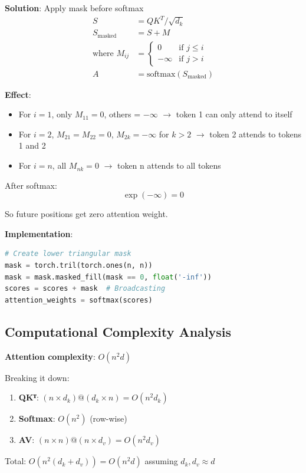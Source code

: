 \documentclass[11pt,oneside]{book}
\begin{document}
\textbf{Solution}: Apply mask before softmax
\begin{align*}
S &= QK^T / \sqrt{d_k} \\
S_{\text{masked}} &= S + M \\
\text{where } M_{ij} &= \begin{cases} 0 & \text{if } j \leq i \\ -\infty & \text{if } j > i \end{cases} \\
A &= \text{softmax}(S_{\text{masked}})
\end{align*}

\textbf{Effect}:
\begin{itemize}
\item For $i=1$, only $M_{11} = 0$, others = $-\infty$ $\to$ token 1 can only attend to itself
\item For $i=2$, $M_{21} = M_{22} = 0$, $M_{2k} = -\infty$ for $k>2$ $\to$ token 2 attends to tokens 1 and 2
\item For $i=n$, all $M_{nk} = 0$ $\to$ token n attends to all tokens
\end{itemize}

After softmax:
\[
\exp(-\infty) = 0
\]

So future positions get zero attention weight.

\textbf{Implementation}:
\begin{lstlisting}[language=Python]
# Create lower triangular mask
mask = torch.tril(torch.ones(n, n))
mask = mask.masked_fill(mask == 0, float('-inf'))
scores = scores + mask  # Broadcasting
attention_weights = softmax(scores)
\end{lstlisting}

\subsection{Computational Complexity Analysis}

\textbf{Attention complexity}: $O(n^2 d)$

Breaking it down:
\begin{enumerate}
\item \textbf{QKᵀ}: $(n \times d_k) @ (d_k \times n) = O(n^2 d_k)$
\item \textbf{Softmax}: $O(n^2)$ (row-wise)
\item \textbf{AV}: $(n \times n) @ (n \times d_v) = O(n^2 d_v)$
\end{enumerate}

Total: $O(n^2(d_k + d_v)) = O(n^2 d)$ assuming $d_k, d_v \approx d$
\end{document}
